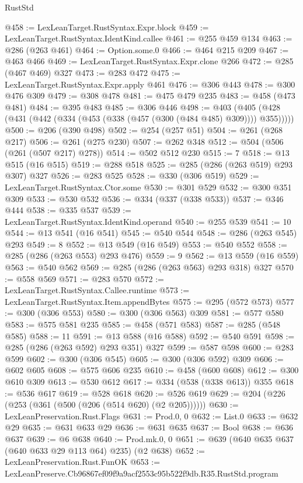 \begin{lexlean}{RustStd}
\begin{coremodule}
@458 := LexLeanTarget.RustSyntax.Expr.block
@459 := LexLeanTarget.RustSyntax.IdentKind.callee
@461 := @255 @459 @134
@463 := @286 (@263 @461)
@464 := Option.some.{0}
@466 := @464 @215 @209
@467 := @463 @466
@469 := LexLeanTarget.RustSyntax.Expr.clone @266
@472 := @285 (@467 @469) @327
@473 := @283 @472
@475 := LexLeanTarget.RustSyntax.Expr.apply @461
@476 := @306 @443
@478 := @300 @476 @309
@479 := @308 @478
@481 := @475 @479 @235
@483 := @458 (@473 @481)
@484 := @395 @483
@485 := @306 @446
@498 := @403 (@405 (@428 (@431 (@442 (@334 (@453 (@338 (@457 (@300 (@484 @485) @309)))) @355)))))
@500 := @206 (@390 @498)
@502 := @254 (@257 @51)
@504 := @261 (@268 @217)
@506 := @261 (@275 @230)
@507 := @262 @348
@512 := @504 (@506 (@261 (@507 @217) @278))
@514 := @502 @512 @230
@515 := 7
@518 := @13 @515 (@16 @515)
@519 := @288 @518
@525 := @285 (@286 (@263 @519) @293 @307) @327
@526 := @283 @525
@528 := @330 (@306 @519)
@529 := LexLeanTarget.RustSyntax.Ctor.some
@530 := @301 @529
@532 := @300 @351 @309
@533 := @530 @532
@536 := @334 (@337 (@338 @533))
@537 := @346 @444
@538 := @335 @537
@539 := LexLeanTarget.RustSyntax.IdentKind.operand
@540 := @255 @539
@541 := 10
@544 := @13 @541 (@16 @541)
@545 := @540 @544
@548 := @286 (@263 @545) @293
@549 := 8
@552 := @13 @549 (@16 @549)
@553 := @540 @552
@558 := @285 (@286 (@263 @553) @293 @476)
@559 := 9
@562 := @13 @559 (@16 @559)
@563 := @540 @562
@569 := @285 (@286 (@263 @563) @293 @318) @327
@570 := @558 @569
@571 := @283 @570
@572 := LexLeanTarget.RustSyntax.Callee.runtime
@573 := LexLeanTarget.RustSyntax.Item.appendBytes
@575 := @295 (@572 @573)
@577 := @300 (@306 @553)
@580 := @300 (@306 @563) @309
@581 := @577 @580
@583 := @575 @581 @235
@585 := @458 (@571 @583)
@587 := @285 (@548 @585)
@588 := 11
@591 := @13 @588 (@16 @588)
@592 := @540 @591
@598 := @285 (@286 (@263 @592) @293 @351) @327
@599 := @587 @598
@600 := @283 @599
@602 := @300 (@306 @545)
@605 := @300 (@306 @592) @309
@606 := @602 @605
@608 := @575 @606 @235
@610 := @458 (@600 @608)
@612 := @300 @610 @309
@613 := @530 @612
@617 := @334 (@538 (@338 @613)) @355
@618 := @536 @617
@619 := @528 @618
@620 := @526 @619
@629 := @204 (@226 (@253 (@361 (@500 (@206 (@514 @620) (@2 @205))))))
@630 := LexLeanPreservation.Rust.Flags
@631 := Prod.{0, 0}
@632 := List.{0}
@633 := @632 @29
@635 := @631 @633 @29
@636 := @631 @635
@637 := Bool
@638 := @636 @637
@639 := @6 @638
@640 := Prod.mk.{0, 0}
@651 := @639 (@640 @635 @637 (@640 @633 @29 @113 @64) @235) (@2 @638)
@652 := LexLeanPreservation.Rust.FunOK
@653 := LexLeanPreserve.Cb96867ef09f9a9acf2553c95b522f9db.R35.RustStd.program

\end{coremodule}
\end{lexlean}
